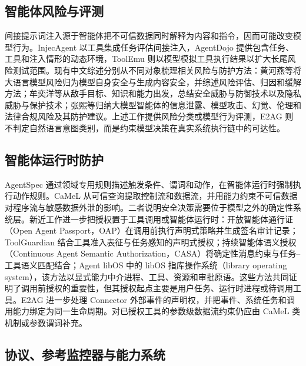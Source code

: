 \subsection{智能体风险与评测}

间接提示词注入源于智能体把不可信数据同时解释为内容和指令，因而可能改变模型行为。InjecAgent 以工具集成任务评估间接注入，AgentDojo 提供包含任务、工具和注入情形的动态环境，ToolEmu 则以模型模拟工具执行结果以扩大长尾风险测试范围\cite{injecagent,agentdojo,toolemu}。现有中文综述分别从不同对象梳理相关风险与防护方法：黄河燕等将大语言模型风险归为模型自身安全与生成内容安全，并综述风险评估、归因和缓解方法\cite{huang-llm-safety}；牟奕洋等从敌手目标、知识和能力出发，总结安全威胁与防御技术以及隐私威胁与保护技术\cite{mu-llm-security}；张熙等归纳大模型智能体的信息泄露、模型攻击、幻觉、伦理和法律合规风险及其防护建议\cite{zhang-agent-security}。上述工作提供风险分类或模型行为评测，E2AG 则不判定自然语言意图类别，而是约束模型决策在真实系统执行链中的可达性。

\subsection{智能体运行时防护}

AgentSpec 通过领域专用规则描述触发条件、谓词和动作，在智能体运行时强制执行动作规则\cite{agentspec}。CaMeL 从可信查询提取控制流和数据流，并用能力约束不可信数据对程序流与敏感数据外泄的影响\cite{camel}。二者说明安全决策需要位于模型之外的确定性系统层。新近工作进一步把授权置于工具调用或智能体运行时：开放智能体通行证（Open Agent Passport，OAP）在调用前执行声明式策略并生成签名审计记录\cite{oap}；ToolGuardian 结合工具准入表征与任务感知的声明式授权\cite{toolguardian}；持续智能体语义授权（Continuous Agent Semantic Authorization，CASA）将确定性消息约束与任务--工具语义匹配结合\cite{casa}；Agent libOS 中的 libOS 指库操作系统（library operating system），该方法以显式能力中介进程、工具、资源和审批原语\cite{agent-libos}。这些方法共同证明了调用前授权的重要性，但其授权起点主要是用户任务、运行时进程或待调用工具。E2AG 进一步处理 Connector 外部事件的声明权，并把事件、系统任务和调用能力绑定为同一生命周期。对已授权工具的参数级数据流约束仍应由 CaMeL 类机制或参数谓词补充。

\subsection{协议、参考监控器与能力系统}

